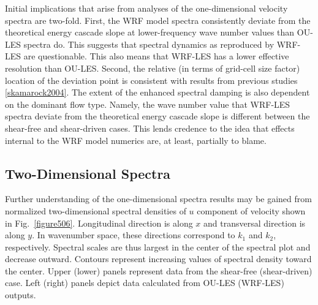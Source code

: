 Initial implications that arise from analyses of the one-dimensional velocity spectra are two-fold. First, the WRF model spectra consistently deviate from the theoretical energy cascade slope at lower-frequency wave number values than OU-LES spectra do. This suggests that spectral dynamics as reproduced by WRF-LES are questionable. This also means that WRF-LES has a lower effective resolution than OU-LES. Second, the relative (in terms of grid-cell size factor) location of the deviation point is consistent with results from previous studies \autoref{skamarock2004}. The extent of the enhanced spectral damping is also dependent on the dominant flow type. Namely, the wave number value that WRF-LES spectra deviate from the theoretical energy cascade slope is different between the shear-free and shear-driven cases. This lends credence to the idea that effects internal to the WRF model numerics are, at least, partially to blame. 

\subsection{Two-Dimensional Spectra}
\label{spectra2d-533}

Further understanding of the one-dimensional spectra results may be gained from normalized two-dimensional spectral densities of $u$ component of velocity shown in Fig.~\ref{figure506}. Longitudinal direction is along $x$ and transversal direction is along $y$. In wavenumber space, these directions correspond to $k_1$ and $k_2$, respectively. Spectral scales are thus largest in the center of the spectral plot and decrease outward. Contours represent increasing values of spectral density toward the center. Upper (lower) panels represent data from the shear-free (shear-driven) case. Left (right) panels depict data calculated from OU-LES (WRF-LES) outputs.


